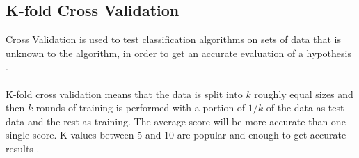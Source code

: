 \subsection{K-fold Cross Validation}
Cross Validation is used to test classification algorithms on sets of data that is unknown to the algorithm, in order to get an accurate evaluation of a hypothesis \citep{crossvalid_ai}.\\\\
K-fold cross validation means that the data is split into $k$ roughly equal sizes and then $k$ rounds of training is performed with a portion of $1/k$ of the data as test data and the rest as training. The average score will be more accurate than one single score. K-values between 5 and 10 are popular and enough to get accurate results \citep{crossvalid_ai}.
